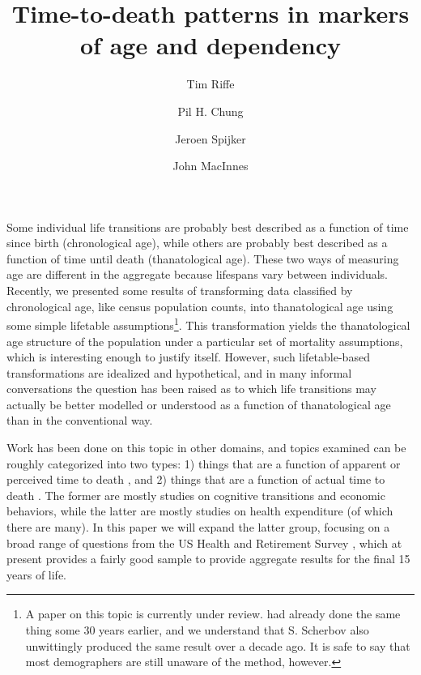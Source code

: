 \documentclass{article}
\begin{document}
\title{Time-to-death patterns in markers of age and dependency}

\author[1]{Tim Riffe}
\author[1]{Pil H. Chung}
\author[2,3]{Jeroen Spijker}
\author[4]{John MacInnes}

\maketitle

Some individual life transitions are probably best described as a function of
time since birth (chronological age), while others are probably best described as a
function of time until death (thanatological age). These two ways of
measuring age are different in the aggregate because lifespans vary between
individuals.
Recently, we presented some results of transforming
data classified by chronological age, like census population counts, into
thanatological age using some simple lifetable
assumptions\footnote{\citep{riffe2014paaposter} A paper on this topic is
currently under review. \citet{brouard1986structure, brouard1989mouvements}
had already done the same thing some 30 years earlier, and we understand that
S. Scherbov also unwittingly produced the same result over a decade ago. It is
safe to say that most demographers are still unaware of the method, however.}.
This transformation yields the thanatological age structure of the population
under a particular set of mortality assumptions, which is interesting enough to
justify itself.
However, such lifetable-based transformations are idealized and hypothetical, and in many informal
conversations the question has been raised as to which life transitions
may actually be better modelled or understood as a function of thanatological
age than in the conventional way.

Work has been done on this topic in other domains, and
topics examined can be roughly categorized into two types: 1) things that are a
function of apparent or perceived time to death
\citep{carstensen2006influence,gan2004subjective,salm2010subjective,van2010living}, and 2) things that are a function of actual time to death
\citep{miller2001increasing,seshamani2004longitudinal}. The former are mostly
studies on cognitive transitions and economic behaviors, while the latter are
mostly studies on health expenditure (of which there are many). In this paper we
will expand the latter group, focusing on a broad range of questions from the US
Health and Retirement Survey \citep{HRS}, which at present provides a fairly
good sample to provide aggregate results for the final 15 years of life.
\end{document}
